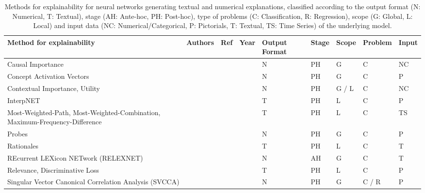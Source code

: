 \documentclass[final,1p,times]{elsarticle}
\begin{document}
\begin{table}[h!]
\footnotesize
    \caption{Methods for explainability for neural networks generating textual and numerical explanations, classified according to the output format (N: Numerical, T: Textual), stage (AH: Ante-hoc, PH: Post-hoc), type of problems (C: Classification, R: Regression), scope (G: Global, L: Local) and input data (NC: Numerical/Categorical, P: Pictorials, T: Textual, TS: Time Series) of the underlying model.}
    \label{tab:neural-networks-textual-numeric}
    \begin{tabular}{m{3.8cm} m{2.1cm} m{0.5cm} m{0.5cm} m{0.85cm} m{0.5cm} m{0.6cm} m{0.7cm} m{0.5cm}}
    \hline
    Method for explainability & Authors & Ref & Year & Output Format & Stage & Scope & Problem & Input\\
    \hline
    Causal Importance &  \citeauthor{feraud2002methodology} &  \cite{feraud2002methodology} &  \citeyear{feraud2002methodology} & N & PH & G & C & NC\\
    Concept Activation Vectors &  \citeauthor{kim2018interpretability} &  \cite{kim2018interpretability} &  \citeyear{kim2018interpretability} & N & PH & G & C & P\\
    Contextual Importance, Utility &  \citeauthor{framling1996explaining} &  \cite{framling1996explaining} &  \citeyear{framling1996explaining} & N & PH & G / L & C & NC\\
    InterpNET &  \citeauthor{barratt2017interpnet} &  \cite{barratt2017interpnet} &  \citeyear{barratt2017interpnet} & T & PH & L & C & P\\
    Most-Weighted-Path, Most-Weighted-Combination, Maximum-Frequency-Difference &  \citeauthor{garcia2019human} &  \cite{garcia2019human} &  \citeyear{garcia2019human} & T & PH & L & C & TS\\
    Probes &  \citeauthor{alain2017understanding} &  \cite{alain2017understanding} &  \citeyear{alain2017understanding} & N & PH & G & C & P\\
    Rationales &  \citeauthor{lei2016rationalizing} &  \cite{lei2016rationalizing} &  \citeyear{lei2016rationalizing} & T & PH & L & C & T\\
    REcurrent LEXicon NETwork (RELEXNET) &  \citeauthor{clos2017towards} &  \cite{clos2017towards} &  \citeyear{clos2017towards} & N & AH & G & C & T\\
    Relevance, Discriminative Loss &  \citeauthor{hendricks2016generating} &  \cite{hendricks2016generating,hendricks2018grounding} &  \citeyear{hendricks2016generating,hendricks2018grounding} & T & PH & L & C & P\\
    Singular Vector Canonical Correlation Analysis (SVCCA) &  \citeauthor{raghu2017svcca} &  \cite{raghu2017svcca} &  \citeyear{raghu2017svcca} & N & PH & G & C / R & P\\
    \hline
\end{tabular}
\end{table}
\end{document}
